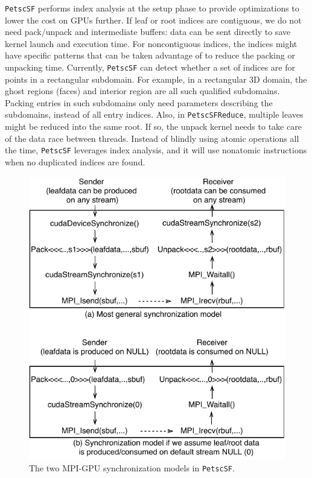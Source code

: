 \documentclass[10pt,journal,compsoc]{IEEEtran}
\begin{document}
{\tt PetscSF} performs index analysis at the setup phase to provide optimizations to lower the
cost on GPUs further. If  leaf or root indices
are contiguous, we do not need pack/unpack and intermediate
buffers: data can be sent directly to save kernel launch and
execution time. For noncontiguous indices, the indices might have specific
patterns that can be taken advantage of to reduce the packing or unpacking time. Currently, {\tt PetscSF} can detect whether a set of indices are for points in a
rectangular subdomain. For example, in a rectangular 3D domain, the ghost
regions (faces) and interior region are all such qualified subdomains. Packing entries in such subdomains
only need parameters describing the subdomains, instead of all entry indices.
Also,  in \texttt{PetscSFReduce}, multiple leaves might be reduced into the same root. If so, the unpack kernel needs to take care
of the data race between threads. Instead of blindly using atomic operations all the time, {\tt PetscSF} leverages index analysis, and it will use nonatomic
instructions when no duplicated indices are found.

\begin{figure}[tb]
\begin{center}
\includegraphics[width=.9\linewidth]{figures/SFSyncModels.pdf}
\caption{The two MPI-GPU synchronization models in {\tt PetscSF}.}
\label{fig:sf_sync_models}
\end{center}
\end{figure}
\end{document}
